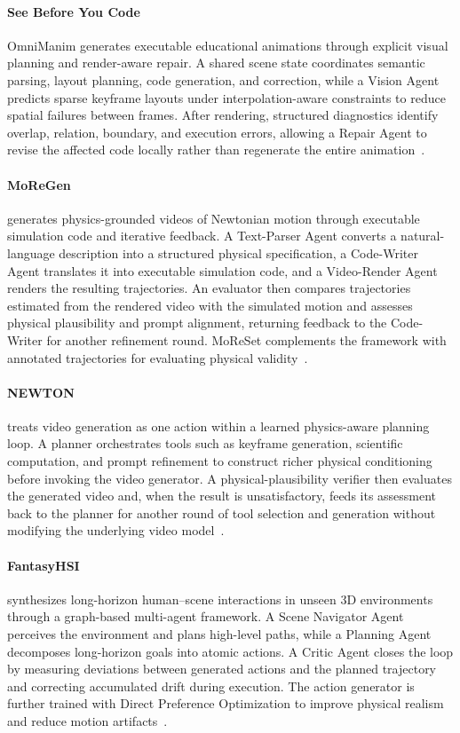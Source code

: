 \paragraph{See Before You Code}
OmniManim generates executable educational animations through explicit visual planning and render-aware repair. A shared scene state coordinates semantic parsing, layout planning, code generation, and correction, while a Vision Agent predicts sparse keyframe layouts under interpolation-aware constraints to reduce spatial failures between frames. After rendering, structured diagnostics identify overlap, relation, boundary, and execution errors, allowing a Repair Agent to revise the affected code locally rather than regenerate the entire animation~\cite{avg260515585}.

\paragraph{MoReGen}
 generates physics-grounded videos of Newtonian motion through executable simulation code and iterative feedback. A Text-Parser Agent converts a natural-language description into a structured physical specification, a Code-Writer Agent translates it into executable simulation code, and a Video-Render Agent renders the resulting trajectories. An evaluator then compares trajectories estimated from the rendered video with the simulated motion and assesses physical plausibility and prompt alignment, returning feedback to the Code-Writer for another refinement round. MoReSet complements the framework with annotated trajectories for evaluating physical validity~\cite{avg251204221}.

\paragraph{NEWTON}
 treats video generation as one action within a learned physics-aware planning loop. A planner orchestrates tools such as keyframe generation, scientific computation, and prompt refinement to construct richer physical conditioning before invoking the video generator. A physical-plausibility verifier then evaluates the generated video and, when the result is unsatisfactory, feeds its assessment back to the planner for another round of tool selection and generation without modifying the underlying video model~\cite{feng2026newton}.

\paragraph{FantasyHSI}
 synthesizes long-horizon human--scene interactions in unseen 3D environments through a graph-based multi-agent framework. A Scene Navigator Agent perceives the environment and plans high-level paths, while a Planning Agent decomposes long-horizon goals into atomic actions. A Critic Agent closes the loop by measuring deviations between generated actions and the planned trajectory and correcting accumulated drift during execution. The action generator is further trained with Direct Preference Optimization to improve physical realism and reduce motion artifacts~\cite{avg250901232}.

